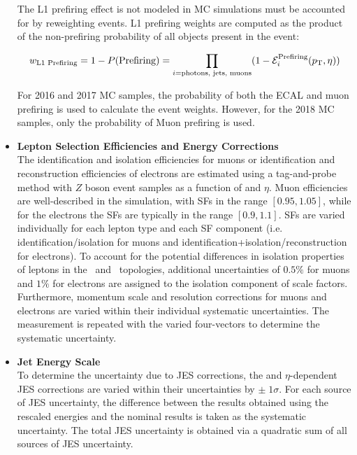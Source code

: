 \begin{refsection}
\begin{itemize}
    The L1 prefiring effect is not modeled in MC simulations must be accounted for by reweighting events.
    L1 prefiring weights are computed as the product of the non-prefiring probability of all objects present in the event:
    \begin{linenomath*}
    \begin{align}
    w_{\text{L1 Prefiring}} = 1 - P(\text{Prefiring}) = \prod_{i=\text{photons, jets, muons}} (1 - \mathcal{E}_i^{\text{Prefiring}} (p_{\mathrm{T}},\eta))
    \end{align}
    \end{linenomath*}
    For 2016 and 2017 MC samples, the probability of both the ECAL and muon prefiring is used to calculate the event weights.
    However, for the 2018 MC samples, only the probability of Muon prefiring is used.
    \item {\bf Lepton Selection Efficiencies and Energy Corrections} \\
    The identification and isolation efficiencies for muons or identification and reconstruction efficiencies of electrons are estimated using a tag-and-probe method with $Z$ boson event samples as a function of \pT and $\eta$. 
    Muon efficiencies are well-described in the simulation, with SFs in the range $[0.95,1.05]$, while for the electrons the SFs are typically in the range $[0.9,1.1]$. 
    SFs are varied individually for each lepton type and each SF component (i.e. identification/isolation for muons and identification+isolation/reconstruction for electrons). 
    To account for the potential differences in isolation properties of leptons in the \ttbar\ and \zjets\ topologies, additional uncertainties of $0.5\%$ for muons and $1\%$ for electrons are assigned to the isolation component of scale factors.
    Furthermore, momentum scale and resolution corrections for muons and electrons are varied within their individual systematic uncertainties. 
    The measurement is repeated with the varied four-vectors to determine the systematic uncertainty.
    \item {\bf Jet Energy Scale} \\
    To determine the uncertainty due to JES corrections, the \pT and $\eta$-dependent JES corrections are varied within their uncertainties by $\pm \; 1 \sigma$. 
    For each source of JES uncertainty, the difference between the results obtained using the rescaled energies and the nominal results is taken as the systematic uncertainty. 
    The total JES uncertainty is obtained via a quadratic sum of all sources of JES uncertainty.

\end{itemize}
\end{refsection}
